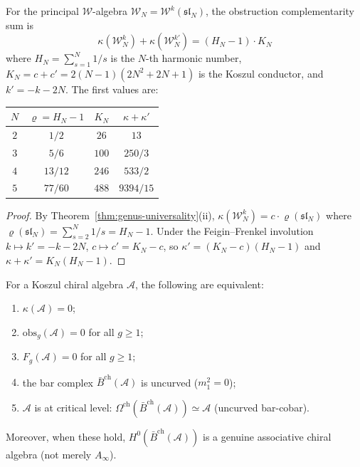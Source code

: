 \begin{corollary}
\label{cor:kappa-sum-wn}
For the principal $\mathcal{W}$-algebra $\mathcal{W}_N = \mathcal{W}^k(\mathfrak{sl}_N)$, the obstruction complementarity sum is
\begin{equation}\label{eq:kappa-sum-wn}
\kappa(\mathcal{W}_N^k) + \kappa(\mathcal{W}_N^{k'}) = (H_N - 1) \cdot K_N
\end{equation}
where $H_N = \sum_{s=1}^N 1/s$ is the $N$-th harmonic number, $K_N = c + c' = 2(N-1)(2N^2+2N+1)$ is the Koszul conductor, and $k' = -k-2N$.  The first values are:
\begin{center}
\begin{tabular}{cccc}
$N$ & $\varrho = H_N - 1$ & $K_N$ & $\kappa + \kappa'$ \\
\hline
$2$ & $1/2$ & $26$ & $13$ \\
$3$ & $5/6$ & $100$ & $250/3$ \\
$4$ & $13/12$ & $246$ & $533/2$ \\
$5$ & $77/60$ & $488$ & $9394/15$
\end{tabular}
\end{center}
\end{corollary}

\begin{proof}
By Theorem~\ref{thm:genus-universality}(ii), $\kappa(\mathcal{W}_N^k) = c \cdot \varrho(\mathfrak{sl}_N)$ where $\varrho(\mathfrak{sl}_N) = \sum_{s=2}^N 1/s = H_N - 1$.  Under the Feigin--Frenkel involution $k \mapsto k' = -k - 2N$, $c \mapsto c' = K_N - c$, so $\kappa' = (K_N - c)(H_N - 1)$ and $\kappa + \kappa' = K_N(H_N - 1)$.
\end{proof}

\begin{corollary}\label{cor:critical-level-universality}
For a Koszul chiral algebra $\mathcal{A}$, the following are equivalent:
\begin{enumerate}[label=\textup{(\roman*)}]
\item $\kappa(\mathcal{A}) = 0$;
\item $\mathrm{obs}_g(\mathcal{A}) = 0$ for all $g \geq 1$;
\item $F_g(\mathcal{A}) = 0$ for all $g \geq 1$;
\item the bar complex $\bar{B}^{\mathrm{ch}}(\mathcal{A})$ is uncurved \textup{(}$m_1^2 = 0$\textup{)};
\item $\mathcal{A}$ is at critical level: $\Omega^{\mathrm{ch}}(\bar{B}^{\mathrm{ch}}(\mathcal{A})) \simeq \mathcal{A}$ \textup{(}uncurved bar-cobar\textup{)}.
\end{enumerate}
Moreover, when these hold, $H^0(\bar{B}^{\mathrm{ch}}(\mathcal{A}))$ is a genuine associative chiral algebra \textup{(}not merely $A_\infty$\textup{)}.
\end{corollary}

